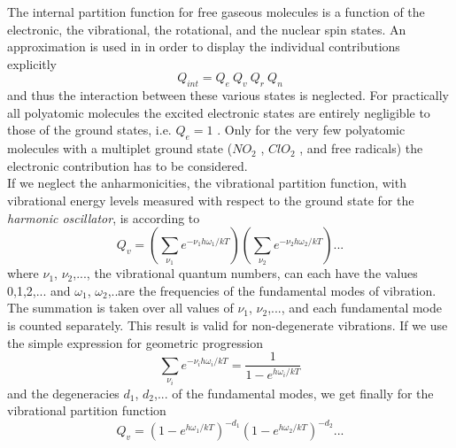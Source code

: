 The internal partition function for free gaseous molecules is a
function of the electronic, the vibrational, the rotational, and the
nuclear spin states. An approximation is used in
\citet{gordyandcook:70} in order to display the individual
contributions explicitly
\begin{equation}\label{eq:abs_theory:int_partition}
 Q_{int}=Q_e~Q_v~Q_r~Q_n
\end{equation}
and thus the interaction between these various states is neglected.
For practically all polyatomic molecules the excited electronic states
are entirely negligible to those of the ground states, i.e. $Q_e=1$ .
Only for the very few polyatomic molecules with a multiplet ground
state ($NO_2$ , $ClO_2$ , and free radicals) the
electronic contribution has to be considered.\\
If we neglect the anharmonicities, the vibrational partition function,
with vibrational energy levels measured with respect to the ground
state for the {\it harmonic oscillator}, is according to \citet{herzberg:45}
\begin{equation}\label{eq:abs_theory:vib_partition}
 Q_v=\left(\sum_{\nu_1}e^{-\nu_1 h\omega_1/kT}\right)\left(\sum_{\nu_2}e^{-\nu_2 h\omega_2/kT}\right)...
\end{equation}
where $\nu_1$, $\nu_2$,..., the vibrational quantum numbers, can each
have the values 0,1,2,... and $\omega_1$, $\omega_2$,..are the
frequencies of the fundamental modes of vibration. The summation is
taken over all values of $\nu_1$, $\nu_2$,..., and each fundamental
mode is counted separately. This result is valid for non-degenerate
vibrations. If we use the simple expression for geometric progression
\begin{equation}\label{eq:abs_theory:geom_progression}
 \sum_{\nu_i}e^{-\nu_i h\omega_i/kT}=\frac{1}{1-e^{h\omega_i/kT}}
\end{equation}
and the degeneracies $d_1$, $d_2$,... of the fundamental modes, we get
finally for the vibrational partition function
\begin{equation}\label{eq:abs_theory:vib_partition_fin}
Q_v=\left(1-e^{h\omega_1/kT}\right)^{-d_1}\left(1-e^{h\omega_2/kT}\right)^{-d_2}...
\end{equation}

